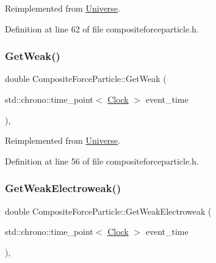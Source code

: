 Reimplemented from \hyperlink{class_universe_af0f4b81950061e63c2855eb40957a5b1}{Universe}.



Definition at line 62 of file compositeforceparticle.\+h.

\mbox{\label{class_composite_force_particle_ab5cc0893a4063cc353ea5d2404f27b0b}} 
\subsubsection{\texorpdfstring{Get\+Weak()}{GetWeak()}}
{\footnotesize\ttfamily double Composite\+Force\+Particle\+::\+Get\+Weak (\begin{DoxyParamCaption}\item[{std\+::chrono\+::time\+\_\+point$<$ \hyperlink{universe_8h_a0ef8d951d1ca5ab3cfaf7ab4c7a6fd80}{Clock} $>$}]{event\+\_\+time }\end{DoxyParamCaption})\hspace{0.3cm}{\ttfamily [inline]}, {\ttfamily [virtual]}}



Reimplemented from \hyperlink{class_universe_a4476b7e0a3fc1764909f556257fd9ec7}{Universe}.



Definition at line 56 of file compositeforceparticle.\+h.

\mbox{\label{class_composite_force_particle_a27762218af4e3c021c89ff4792d81b41}} 
\subsubsection{\texorpdfstring{Get\+Weak\+Electroweak()}{GetWeakElectroweak()}}
{\footnotesize\ttfamily double Composite\+Force\+Particle\+::\+Get\+Weak\+Electroweak (\begin{DoxyParamCaption}\item[{std\+::chrono\+::time\+\_\+point$<$ \hyperlink{universe_8h_a0ef8d951d1ca5ab3cfaf7ab4c7a6fd80}{Clock} $>$}]{event\+\_\+time }\end{DoxyParamCaption})\hspace{0.3cm}{\ttfamily [inline]}, {\ttfamily [virtual]}}



